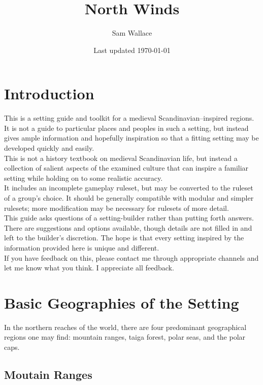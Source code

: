 \documentclass[a4paper]{article}
\title{North Winds}
\author{Sam Wallace}
\date{Last updated \today}
\begin{document}
\maketitle
\newpage
\tableofcontents

\newpage

\begin{multicols}{2}
  
\section{Introduction}

This is a setting guide and toolkit for a medieval Scandinavian--inspired regions.
It is not a guide to particular places and peoples in such a setting, but instead gives ample information and hopefully inspiration so that a fitting setting may be developed quickly and easily. \\

This is not a history textbook on medieval Scandinavian life, but instead a collection of salient aspects of the examined culture that can inspire a familiar setting while holding on to some realistic accuracy.
\\

It includes an incomplete gameplay ruleset, but may be converted to the ruleset of a group's choice.
It should be generally compatible with modular and simpler rulesets; more modification may be necessary for rulesets of more detail. \\

This guide asks questions of a setting-builder rather than putting forth answers.
There are suggestions and options available, though details are not filled in and left to the builder's discretion.
The hope is that every setting inspired by the information provided here is unique and different. \\

If you have feedback on this, please contact me through appropriate channels and let me know what you think.
I appreciate all feedback.


\section{Basic Geographies of the Setting}

In the northern reaches of the world, there are four predominant geographical regions one may find: mountain ranges, taiga forest, polar seas, and the polar caps.

\subsection{Moutain Ranges}


\end{multicols}
\end{document}
